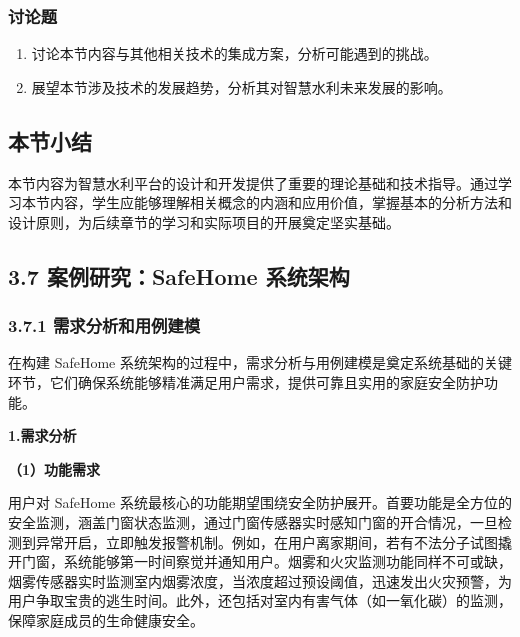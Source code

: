 \subsubsection{讨论题}\label{ux8ba8ux8bbaux9898-2}

\begin{enumerate}
\def\labelenumi{\arabic{enumi}.}
\setcounter{enumi}{6}
\tightlist
\item
  讨论本节内容与其他相关技术的集成方案，分析可能遇到的挑战。
\item
  展望本节涉及技术的发展趋势，分析其对智慧水利未来发展的影响。
\end{enumerate}

\subsection{本节小结}\label{ux672cux8282ux5c0fux7ed3-2}

本节内容为智慧水利平台的设计和开发提供了重要的理论基础和技术指导。通过学习本节内容，学生应能够理解相关概念的内涵和应用价值，掌握基本的分析方法和设计原则，为后续章节的学习和实际项目的开展奠定坚实基础。

\subsection{3.7 案例研究：SafeHome 系统架构}\label{ux6848ux4f8bux7814ux7a76safehome-ux7cfbux7edfux67b6ux6784}

\subsubsection{3.7.1 需求分析和用例建模}\label{ux9700ux6c42ux5206ux6790ux548cux7528ux4f8bux5efaux6a21}

在构建 SafeHome 系统架构的过程中，需求分析与用例建模是奠定系统基础的关键环节，它们确保系统能够精准满足用户需求，提供可靠且实用的家庭安全防护功能。

\textbf{1.需求分析}

\textbf{（1）功能需求}

用户对 SafeHome 系统最核心的功能期望围绕安全防护展开。首要功能是全方位的安全监测，涵盖门窗状态监测，通过门窗传感器实时感知门窗的开合情况，一旦检测到异常开启，立即触发报警机制。例如，在用户离家期间，若有不法分子试图撬开门窗，系统能够第一时间察觉并通知用户。烟雾和火灾监测功能同样不可或缺，烟雾传感器实时监测室内烟雾浓度，当浓度超过预设阈值，迅速发出火灾预警，为用户争取宝贵的逃生时间。此外，还包括对室内有害气体（如一氧化碳）的监测，保障家庭成员的生命健康安全。

